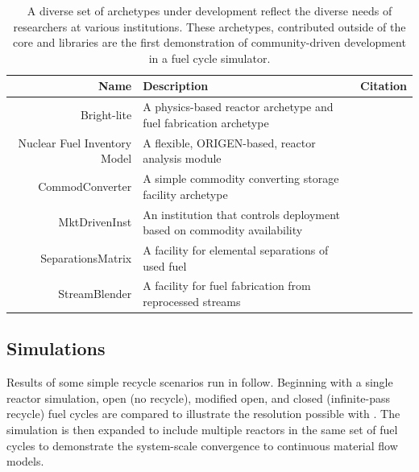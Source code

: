 \begin{table}[h]
\centering
\begin{tabularx}{\textwidth}{|r|X|r|}
\hline
\textbf{Name} & \textbf{Description} & \textbf{Citation} \\
\hline
Bright-lite & A physics-based reactor archetype and fuel fabrication archetype & \cite{flanagan_bright-lite_2014} \\
Nuclear Fuel Inventory Model & A flexible, ORIGEN-based, reactor analysis module & \cite{skutnik_nuclear_2014} \\
CommodConverter & A simple commodity converting storage facility archetype  & \cite{huff_commodconverter_2014} \\
MktDrivenInst & An institution that controls deployment based on commodity availability & \cite{huff_mktdriveninst_2014} \\
SeparationsMatrix & A facility for elemental separations of used fuel & \cite{huff_streamblender_2014} \\
StreamBlender & A facility for fuel fabrication from reprocessed streams & \cite{huff_streamblender_2014} \\
\hline
\end{tabularx}
\caption{A diverse set of archetypes under development reflect the diverse 
needs of researchers at various institutions. These archetypes, contributed 
outside of the \Cyclus core and \Cycamore libraries are the first demonstration 
of community-driven development in a fuel cycle simulator.}
\label{tab:archetypes}
\end{table}


\subsection{Simulations}


Results of some simple recycle scenarios run in \Cyclus follow. Beginning with a single
reactor simulation, open (no recycle), modified open, and closed (infinite-pass recycle) 
fuel cycles are compared to illustrate the resolution possible with \Cyclus.  The simulation
is then expanded to include multiple reactors in the same set of fuel cycles to demonstrate
the system-scale convergence to continuous material flow models. 

